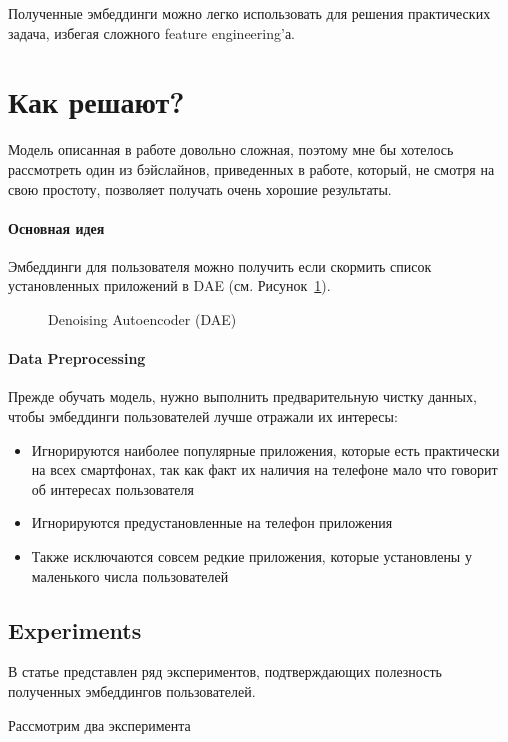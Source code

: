 Полученные эмбеддинги можно легко использовать для решения практических задача, избегая сложного feature engineering'а.

\section{Как решают?}

Модель описанная в работе довольно сложная, поэтому мне бы хотелось рассмотреть один из бэйслайнов, приведенных в работе, который, не смотря на свою простоту, позволяет получать очень хорошие результаты.

\paragraph{Основная идея} Эмбеддинги для пользователя можно получить если скормить список установленных приложений в DAE (см. Рисунок~\ref{fig:dae}).

\begin{figure}[ht]
    \centering
    
    \caption{\footnotesize{Denoising Autoencoder (DAE)}}
    \label{fig:dae}
\end{figure}

\paragraph{Data Preprocessing} Прежде обучать модель, нужно выполнить предварительную чистку данных, чтобы эмбеддинги пользователей лучше отражали их интересы:
\begin{itemize}
    \item Игнорируются наиболее популярные приложения, которые есть практически на всех смартфонах, так как факт их наличия на телефоне мало что говорит об интересах пользователя
    \item Игнорируются предустановленные на телефон приложения
    \item Также исключаются совсем редкие приложения, которые установлены у маленького числа пользователей
\end{itemize}

\subsection{Experiments}

В статье представлен ряд экспериментов, подтверждающих полезность полученных эмбеддингов пользователей.

Рассмотрим два эксперимента

